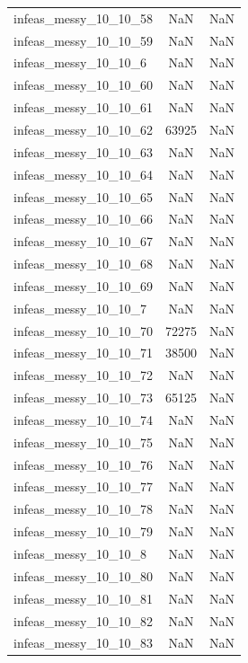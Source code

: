 \begin{longtable}{lcc}
infeas\_messy\_10\_10\_58  &      NaN &    NaN \\
infeas\_messy\_10\_10\_59  &      NaN &    NaN \\
infeas\_messy\_10\_10\_6   &      NaN &    NaN \\
infeas\_messy\_10\_10\_60  &      NaN &    NaN \\
infeas\_messy\_10\_10\_61  &      NaN &    NaN \\
infeas\_messy\_10\_10\_62  &    63925 &    NaN \\
infeas\_messy\_10\_10\_63  &      NaN &    NaN \\
infeas\_messy\_10\_10\_64  &      NaN &    NaN \\
infeas\_messy\_10\_10\_65  &      NaN &    NaN \\
infeas\_messy\_10\_10\_66  &      NaN &    NaN \\
infeas\_messy\_10\_10\_67  &      NaN &    NaN \\
infeas\_messy\_10\_10\_68  &      NaN &    NaN \\
infeas\_messy\_10\_10\_69  &      NaN &    NaN \\
infeas\_messy\_10\_10\_7   &      NaN &    NaN \\
infeas\_messy\_10\_10\_70  &    72275 &    NaN \\
infeas\_messy\_10\_10\_71  &    38500 &    NaN \\
infeas\_messy\_10\_10\_72  &      NaN &    NaN \\
infeas\_messy\_10\_10\_73  &    65125 &    NaN \\
infeas\_messy\_10\_10\_74  &      NaN &    NaN \\
infeas\_messy\_10\_10\_75  &      NaN &    NaN \\
infeas\_messy\_10\_10\_76  &      NaN &    NaN \\
infeas\_messy\_10\_10\_77  &      NaN &    NaN \\
infeas\_messy\_10\_10\_78  &      NaN &    NaN \\
infeas\_messy\_10\_10\_79  &      NaN &    NaN \\
infeas\_messy\_10\_10\_8   &      NaN &    NaN \\
infeas\_messy\_10\_10\_80  &      NaN &    NaN \\
infeas\_messy\_10\_10\_81  &      NaN &    NaN \\
infeas\_messy\_10\_10\_82  &      NaN &    NaN \\
infeas\_messy\_10\_10\_83  &      NaN &    NaN \\

\end{longtable}
